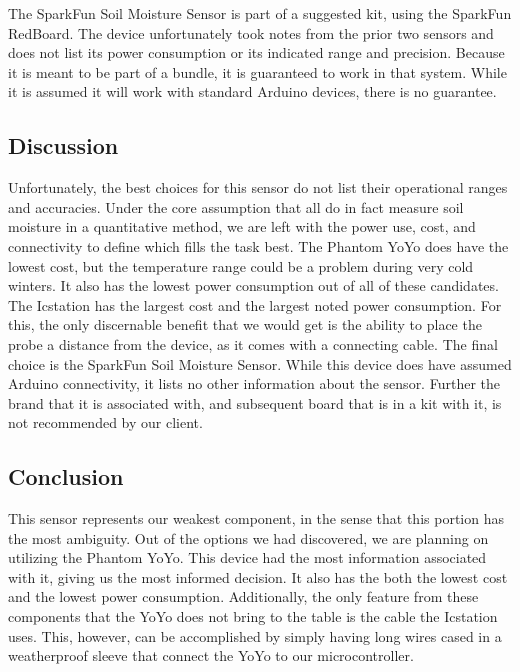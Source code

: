 \documentclass[IEEEtran,letterpaper,10pt,titlepage,fleqn,draftclsnofoot,onecolumn]{article}
\begin{document}
\vspace{1mm}

The SparkFun Soil Moisture Sensor is part of a suggested kit, using the SparkFun RedBoard. The device unfortunately took notes from the prior two sensors and does not list its power consumption or its indicated range and precision. Because it is meant to be part of a bundle, it is guaranteed to work in that system. While it is assumed it will work with standard Arduino devices, there is no guarantee.

\subsection{Discussion}

Unfortunately, the best choices for this sensor do not list their operational ranges and accuracies. Under the core assumption that all do in fact measure soil moisture in a quantitative method, we are left with the power use, cost, and connectivity to define which fills the task best. The Phantom YoYo does have the lowest cost, but the temperature range could be a problem during very cold winters. It also has the lowest power consumption out of all of these candidates. The Icstation has the largest cost and the largest noted power consumption. For this, the only discernable benefit that we would get is the ability to place the probe a distance from the device, as it comes with a connecting cable. The final choice is the SparkFun Soil Moisture Sensor. While this device does have assumed Arduino connectivity, it lists no other information about the sensor. Further the brand that it is associated with, and subsequent board that is in a kit with it, is not recommended by our client.

\clearpage

\subsection{Conclusion}

This sensor represents our weakest component, in the sense that this portion has the most ambiguity. Out of the options we had discovered, we are planning on utilizing the Phantom YoYo. This device had the most information associated with it, giving us the most informed decision. It also has the both the lowest cost and the lowest power consumption. Additionally, the only feature from these components that the YoYo does not bring to the table is the cable the Icstation uses. This, however, can be accomplished by simply having long wires cased in a weatherproof sleeve that connect the YoYo to our microcontroller. 
\end{document}
